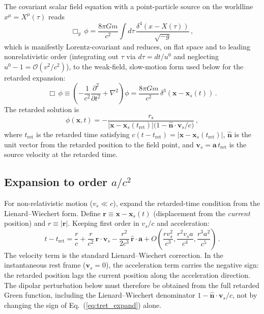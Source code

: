 \documentclass[11pt]{article}
\newcommand{\rs}{r_{\mathrm{s}}}
\begin{document}
The covariant scalar field equation with a
point-particle source on the worldline
$x^\mu=X^\mu(\tau)$ reads
\begin{equation}\label{eq:wave_covariant}
  \Box_g\,\phi
  = \frac{8\pi Gm}{c^2}\!\int d\tau\,
    \frac{\delta^4(x-X(\tau))}{\sqrt{-g}}\,,
\end{equation}
which is manifestly Lorentz-covariant and reduces, on
flat space and to leading nonrelativistic order
(integrating out $\tau$ via $d\tau=dt/u^0$ and
neglecting $u^0-1=\mathcal{O}(v^2/c^2)$), to the
weak-field, slow-motion form used below for the
retarded expansion:
\begin{equation}\label{eq:wave}
  \Box\,\phi \equiv
  \left(-\frac{1}{c^2}\frac{\partial^2}{\partial t^2}
  + \nabla^2\right)\phi
  = \frac{8\pi Gm}{c^2}\,\delta^3(\mathbf{x} - \mathbf{x}_s(t))\,.
\end{equation}
The retarded solution is
\begin{equation}\label{eq:retarded}
  \phi(\mathbf{x},t) = -\frac{\rs}
  {|\mathbf{x} - \mathbf{x}_s(t_{\mathrm{ret}})|
  \bigl(1 - \hat{\mathbf{n}}\cdot\mathbf{v}_s/c\bigr)}\,,
\end{equation}
where $t_{\mathrm{ret}}$ is the retarded time satisfying
$c(t - t_{\mathrm{ret}}) = |\mathbf{x} -
\mathbf{x}_s(t_{\mathrm{ret}})|$,
$\hat{\mathbf{n}}$ is the unit vector from the retarded
position to the field point, and
$\mathbf{v}_s = \mathbf{a}\,t_{\mathrm{ret}}$ is the
source velocity at the retarded time.

\subsection{Expansion to order $a/c^2$}

For non-relativistic motion ($v_s \ll c$), expand the
retarded-time condition from the Lienard--Wiechert form.  Define
$\mathbf{r} \equiv \mathbf{x} - \mathbf{x}_s(t)$
(displacement from the \emph{current} position) and
$r \equiv |\mathbf{r}|$.  Keeping first order in $v_s/c$
and acceleration:
\begin{equation}\label{eq:tret_expand}
  t - t_{\mathrm{ret}} = \frac{r}{c}
  + \frac{r}{c^2}\,\hat{\mathbf{r}}\cdot\mathbf{v}_s
  - \frac{r^2}{2c^3}\,\hat{\mathbf{r}}\cdot\mathbf{a}
  + O\!\left(\frac{r v_s^2}{c^3},
             \frac{r^2 v_s a}{c^4},
             \frac{r^3 a^2}{c^5}\right)\,.
\end{equation}
The velocity term is the standard Lienard--Wiechert
correction.  In the instantaneous rest frame
($\mathbf{v}_s=0$), the acceleration term carries the
negative sign: the retarded position lags the current
position along the acceleration direction.  The dipolar
perturbation below must therefore be obtained from the
full retarded Green function, including the
Lienard--Wiechert denominator
$1-\hat{\mathbf{n}}\cdot\mathbf{v}_s/c$, not by changing
the sign of Eq.~(\ref{eq:tret_expand}) alone.
\end{document}

